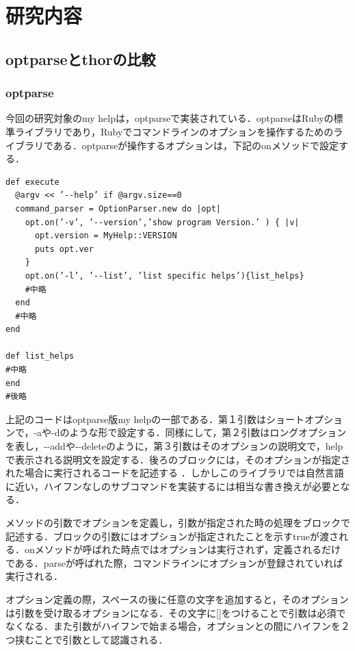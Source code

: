 \chapter{研究内容}\label{ux7814ux7a76ux5185ux5bb9}

\section{optparseとthorの比較}\label{}

\subsection{optparse}\label{optparse}

今回の研究対象のmy
helpは，optparseで実装されている．optparseはRubyの標準ライブラリであり，Rubyでコマンドラインのオプションを操作するためのライブラリである\cite{opt1}．optparseが操作するオプションは，下記のonメソッドで設定する．

\begin{screen}
{\small
\begin{verbatim}
def execute
  @argv << ’--help’ if @argv.size==0
  command_parser = OptionParser.new do |opt|
    opt.on(’-v’, ’--version’,’show program Version.’ ) { |v|
      opt.version = MyHelp::VERSION
      puts opt.ver
    }
    opt.on(’-l’, ’--list’, ’list specific helps’){list_helps}
    #中略
  end
  #中略
end
    
def list_helps
#中略
end
#後略
\end{verbatim}}
\end{screen} 


上記のコードはoptparse版my helpの一部である．第１引数はショートオプションで，-aや-dのような形で設定する．同様にして，第２引数はロングオプションを表し，-\/-addや-\/-deleteのように，第３引数はそのオプションの説明文で，helpで表示される説明文を設定する．後ろのブロックには，そのオプションが指定された場合に実行されるコードを記述する
\cite{opt2}．しかしこのライブラリでは自然言語に近い，ハイフンなしのサブコマンドを実装するには相当な書き換えが必要となる．

メソッドの引数でオプションを定義し，引数が指定された時の処理をブロックで記述する．ブロックの引数にはオプションが指定されたことを示すtrueが渡される．onメソッドが呼ばれた時点ではオプションは実行されず，定義されるだけである．parseが呼ばれた際，コマンドラインにオプションが登録されていれば実行される．

オプション定義の際，スペースの後に任意の文字を追加すると，そのオプションは引数を受け取るオプションになる．その文字に{[}{]}をつけることで引数は必須でなくなる．また引数がハイフンで始まる場合，オプションとの間にハイフンを２つ挟むことで引数として認識される．


